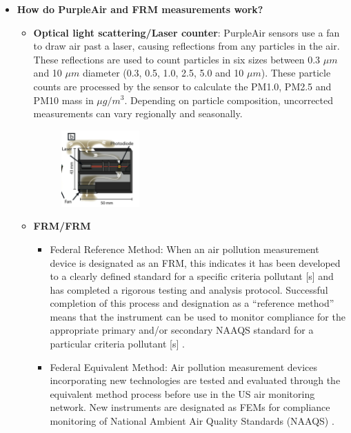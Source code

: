 \documentclass{article}
\begin{document}
\begin{itemize}
\begin{figure}[H]
        \end{figure}
    \item \textbf{How do PurpleAir and FRM measurements work?} {
        \begin{itemize}
            \item \textbf{Optical light scattering/Laser counter}: PurpleAir sensors use a fan to draw air past a laser, causing reflections from any particles in the air. These reflections are used to count particles in six sizes between 0.3 $\mu m$ and 10 $\mu m$ diameter (0.3, 0.5, 1.0, 2.5, 5.0 and 10 $\mu m$). These particle counts are processed by the sensor to calculate the PM1.0, PM2.5 and PM10 mass in $\mu g/m^3$. Depending on particle composition, uncorrected measurements can vary regionally and seasonally. \citep{carvlin2017development}
            \begin{figure}[H]
                \centering
                \includegraphics[width=0.3\textwidth]{img/sensor.png}
                \label{fig:sensor}
            \end{figure}
            \item \textbf{FRM/FRM}
                \begin{itemize}
                    \item Federal Reference Method: When an air pollution measurement device is designated as an FRM, this indicates it has been developed to a clearly defined standard for a specific criteria pollutant [s] and has completed a rigorous testing and analysis protocol. Successful completion of this process and designation as a ``reference method'' means that the instrument can be used to monitor compliance for the appropriate primary and/or secondary NAAQS standard for a particular criteria pollutant [s] \citep{hall2014integrating}.
                    \item Federal Equivalent Method: Air pollution measurement devices incorporating new technologies are tested and evaluated through the equivalent method process before use in the US air monitoring network. New instruments are designated as FEMs for compliance monitoring of National Ambient Air Quality Standards (NAAQS) \citep{hall2014integrating}. 

\end{itemize}
\end{itemize}}
\end{itemize}
\end{document}

